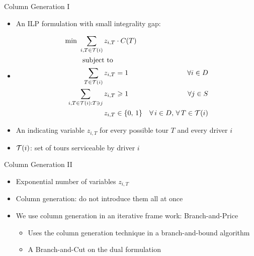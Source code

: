 \documentclass[10pt]{beamer}
\begin{document}
\begin{frame}{Column Generation I}
\begin{itemize}
    \item<1-> An ILP formulation with small integrality gap:
    \item<2->[ ] \begin{align}
        \text {min } \label{cg_obj}	 \sum_{ i, 	T \in \mathcal{T}(i) } z_{i, T} & \cdot C(T) &    &  \\
        \text{subject to }             & & \nonumber  \\
        \label{const:cg1}       \sum_{ T \in \mathcal{T}(i) } z_{ i, T } & = 1  &   \forall i \in D \\
        \label{const:cg2}       \sum_{ i, T \in \mathcal{T}(i): T \ni j } z_{ i, T } & \geqslant 1   &   \forall j \in S \\
        \label{consT:cg3}       z_{ i, T } & \in \{0,\, 1\}    & \forall \, i \in D, \, \forall \, T \in \mathcal{T}(i) 
    \end{align}
    \item<3-> An indicating variable $z_{i, T}$ for every possible \alert{tour} $T$ and every driver $i$
    \item<4-> $\mathcal{T}(i)$: set of tours serviceable by driver $i$
\end{itemize}
\end{frame}

\begin{frame}{Column Generation II}
\begin{itemize}
    \item<1-> Exponential number of variables $z_{i, T}$
    \item<2-> Column generation: do not introduce them all at once
    \item<3-> We use column generation in an iterative frame work: \alert{Branch-and-Price}
    \begin{itemize}
        \item<4-> Uses the column generation technique in a branch-and-bound algorithm
        \item<5-> A \alert{Branch-and-Cut} on the dual formulation
    \end{itemize}
\end{itemize}
\end{frame}
\end{document}
